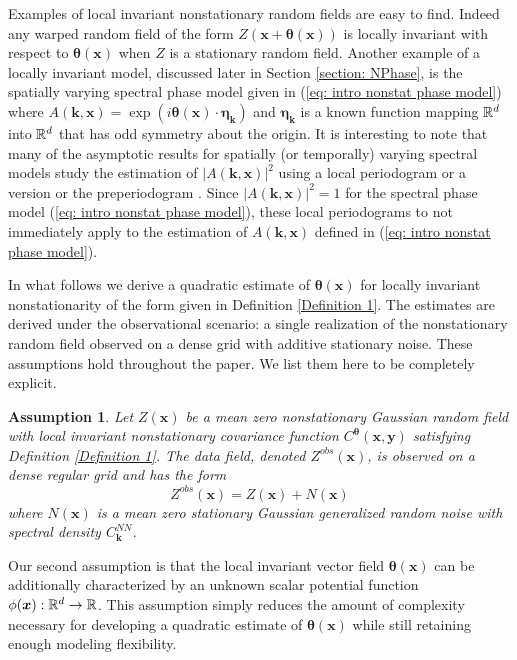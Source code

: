 \documentclass[10pt,noinfoline]{imsart}
\newtheorem{assumption}{Assumption}
\newcommand{\bs}{\boldsymbol}
\begin{document}
Examples of local invariant nonstationary random fields are easy to find. Indeed any warped random field of the form $Z(\bs x + \bs \theta(\bs x))$ is locally invariant with respect to $\bs\theta(\bs x)$ when $Z$ is a stationary random field. Another example of a locally invariant model, discussed later in Section \ref{section: NPhase}, is the spatially varying spectral phase model given in (\ref{eq: intro nonstat phase model}) where $A(\bs k,\bs x)=\exp(i\bs\theta(\bs x) \cdot \bs\eta_{\bs k})$ and $\bs \eta_{\bs k}$ is a known function mapping $\Bbb R^d$ into $\Bbb R^d$ that has odd symmetry about the origin. It is interesting to note that many of the asymptotic results for spatially (or temporally) varying spectral models study the estimation of $|A(\bs k, \bs x)|^2$ using a local periodogram \cite{dahlhaus1997fitting} or a version or the preperiodogram \cite{dahlhaus2000likelihood}. Since  $|A(\bs k, \bs x)|^2 = 1$ for the spectral phase model (\ref{eq: intro nonstat phase model}), these local periodograms to not immediately apply to the estimation of $A(\bs k, \bs x)$ defined in (\ref{eq: intro nonstat phase model}).


In what follows we derive a quadratic estimate of $\bs\theta(\bs x)$ for locally invariant nonstationarity of the form given in Definition \ref{Definition 1}. The estimates are derived under the observational scenario: a single realization of the nonstationary random field observed on a dense grid with additive stationary noise. These assumptions hold throughout the paper. We list them here to be completely explicit.


\begin{assumption}\label{Assumption 4}
Let $Z(\bs x)$ be a mean zero nonstationary Gaussian random field with local invariant nonstationary covariance function $C^{\bs \theta}(\bs x, \bs y)$ satisfying Definition \ref{Definition 1}. The data field, denoted $Z^{obs}(\bs x)$, is observed on a dense regular grid and has the form
\[
Z^{obs}(\bs x) = Z(\bs x) + N(\bs x)
\]
where  $N(\bs x)$ is a mean zero stationary Gaussian generalized random noise with spectral density $C_{\bs k}^{N\!N}$.
\end{assumption}

Our second assumption is that the local invariant vector field $\bs \theta(\bs x)$ can be additionally characterized by an unknown scalar potential function $\phi(\bs x):\Bbb R^d \rightarrow \Bbb R$. This assumption simply  reduces the amount of complexity necessary for  developing a quadratic estimate of $\bs \theta(\bs x)$ while still retaining enough modeling flexibility.
\end{document}
